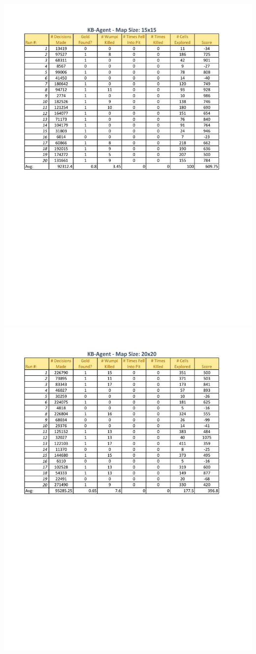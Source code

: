 \includegraphics[width=\linewidth]{figures/KB-Agent-15x15.pdf}
\includegraphics[width=\linewidth]{figures/KB-Agent-20x20.pdf}
